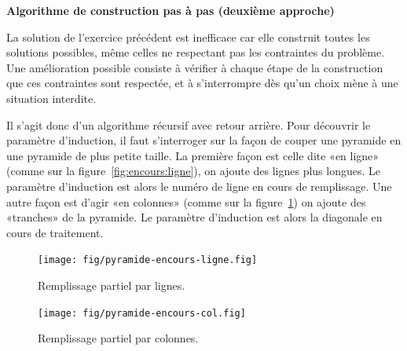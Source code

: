 \documentclass[10pt]{article}\usepackage[correction,nu]{esial}
\begin{document}
\begin{Exercice}\textbf{Algorithme de construction pas à pas (deuxième approche)}

  \noindent La solution de l'exercice précédent est inefficace car elle
  construit toutes les solutions possibles, même celles ne respectant pas les
  contraintes du problème. Une amélioration possible consiste à vérifier à
  chaque étape de la construction que ces contraintes sont respectée, et à
  s'interrompre dès qu'un choix mène à une situation interdite.

  Il s'agit donc d'un algorithme récursif avec retour arrière.  Pour découvrir
  le paramètre d'induction, il faut s'interroger sur la façon de couper une
  pyramide en une pyramide de plus petite taille. La première façon est celle
  dite «en ligne» (comme sur la figure~\ref{fig:encours:ligne}), on ajoute des
  lignes plus longues. Le paramètre d'induction est alors le numéro de ligne en
  cours de remplissage. Une autre façon est d'agir «en colonnes» (comme sur la
  figure~\ref{fig:encours:col}) on ajoute des «tranches» de la pyramide. Le
  paramètre d'induction est alors la diagonale en cours de traitement.
\end{Exercice}

\vspace{-\baselineskip}
\begin{figure}[h] 
  \begin{minipage}{.4\linewidth}
    \centering
    \texttt{[image: fig/pyramide-encours-ligne.fig]}\vspace{-.5\baselineskip}
    \caption{Remplissage partiel par lignes.}
    \label{fig:encours:ligne}
  \end{minipage}\hfill
  \begin{minipage}{.4\linewidth} 
    \centering
    \texttt{[image: fig/pyramide-encours-col.fig]}\vspace{-.5\baselineskip}
    \caption{Remplissage partiel par colonnes.}
    \label{fig:encours:col}
  \end{minipage}
\end{figure}
\vspace{-.5\baselineskip}
\end{document}
